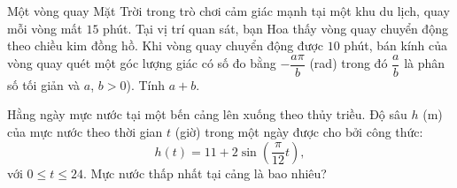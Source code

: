 \begin{ex}%
	Một vòng quay Mặt Trời trong trò chơi cảm giác mạnh tại một khu du lịch, quay mỗi vòng mất $15$ phút. Tại vị trí quan sát, bạn Hoa thấy vòng quay chuyển động theo chiều kim đồng hồ. Khi vòng quay chuyển động được $10$ phút, bán kính của vòng quay quét một góc lượng giác có số đo bằng $-\dfrac{a\pi}{b}$ (rad) trong đó $\dfrac{a}{b}$ là phân số tối giản và $a$, $b > 0$). Tính $a + b$.
\end{ex}

\begin{ex}%
	Hằng ngày mực nước tại một bến cảng lên xuống theo thủy triều. Độ sâu $h$ (m) của mực nước theo thời gian $t$ (giờ) trong một ngày được cho bởi công thức:
	$$h(t)=11+2\sin\left(\dfrac{\pi}{12}t\right),$$
	với $0\le t\le 24$. Mực nước thấp nhất tại cảng là bao nhiêu?
\end{ex}


